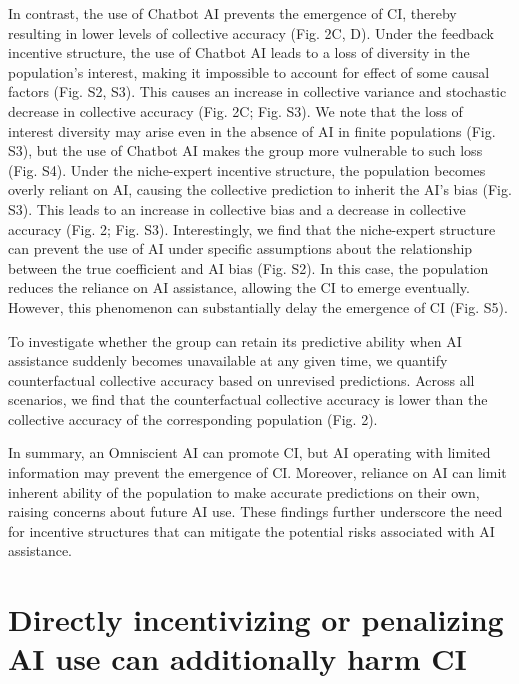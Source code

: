 \documentclass[12pt]{article}
\begin{document}
In contrast, the use of Chatbot AI prevents the emergence of CI, thereby resulting in lower levels of collective accuracy (Fig. 2C, D).
Under the feedback incentive structure, the use of Chatbot AI leads to a loss of diversity in the population's interest, making it impossible to account for effect of some causal factors (Fig. S2, S3).
This causes an increase in collective variance and stochastic decrease in collective accuracy (Fig. 2C; Fig. S3).
We note that the loss of interest diversity may arise even in the absence of AI in finite populations (Fig. S3), but the use of Chatbot AI makes the group more vulnerable to such loss (Fig. S4).
Under the niche-expert incentive structure, the population becomes overly reliant on AI, causing the collective prediction to inherit the AI's bias (Fig. S3).
This leads to an increase in collective bias and a decrease in collective accuracy (Fig. 2; Fig. S3).
Interestingly, we find that the niche-expert structure can prevent the use of AI under specific assumptions about the relationship between the true coefficient and AI bias (Fig. S2).
In this case, the population reduces the reliance on AI assistance, allowing the CI to emerge eventually.
However, this phenomenon can substantially delay the emergence of CI (Fig. S5).

To investigate whether the group can retain its predictive ability when AI assistance suddenly becomes unavailable at any given time, we quantify counterfactual collective accuracy based on unrevised predictions.
Across all scenarios, we find that the counterfactual collective accuracy is lower than the collective accuracy of the corresponding population (Fig. 2).

In summary, an Omniscient AI can promote CI, but AI operating with limited information may prevent the emergence of CI.
Moreover, reliance on AI can limit inherent ability of the population to make accurate predictions on their own, raising concerns about future AI use.
These findings further underscore the need for incentive structures that can mitigate the potential risks associated with AI assistance.

\section*{Directly incentivizing or penalizing AI use can additionally harm CI}
\end{document}
